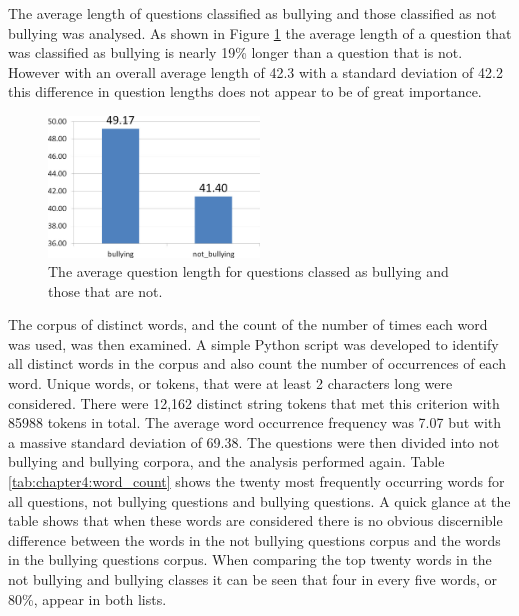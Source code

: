 The average length of questions classified as bullying and those classified as not bullying was analysed. As shown in Figure \ref{fig:chapter4:avg_question_len} the average length of a question that was classified as bullying is nearly 19\% longer than a question that is not. However with an overall average length of 42.3 with a standard deviation of 42.2 this difference in question lengths does not appear to be of great importance.

\begin{figure}[htbp]
	\centering
	\includegraphics[width=0.5\textwidth]{Figures/Chapter4/avg_question_len.jpg}
	\caption[Average question length per class]{The average question length for questions classed as bullying and those that are not.}
	\label{fig:chapter4:avg_question_len}
\end{figure}

The corpus of distinct words, and the count of the number of times each word was used, was then examined. A simple Python script was developed to identify all distinct words in the corpus and also count the number of occurrences of each word. Unique words, or tokens, that were at least 2 characters long were considered. There were 12,162 distinct string tokens that met this criterion with 85988 tokens in total. The average word occurrence frequency was 7.07 but with a massive standard deviation of 69.38. The questions were then divided into not bullying and bullying corpora, and the analysis performed again. Table \ref{tab:chapter4:word_count} shows the twenty most frequently occurring words for all questions, not bullying questions and bullying questions. A quick glance at the table shows that when these words are considered there is no obvious discernible difference between the words in the not bullying questions corpus and the words in the bullying questions corpus. When comparing the top twenty words in the not bullying and bullying classes it can be seen that four in every five words, or 80\%, appear in both lists.

